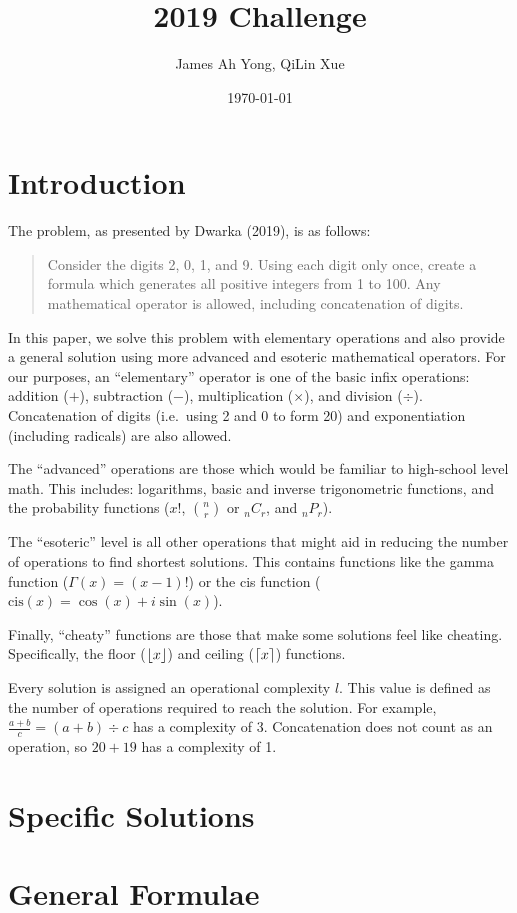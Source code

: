 \documentclass{article}
\title{2019 Challenge}
\author{James Ah Yong, QiLin Xue}
\date\today
\DeclarePairedDelimiter\ceil{\lceil}{\rceil}
\DeclarePairedDelimiter\floor{\lfloor}{\rfloor}
\begin{document}
\maketitle

\section{Introduction}

The problem, as presented by Dwarka (2019), is as follows:

\begin{quotation}
  Consider the digits 2, 0, 1, and 9.
  Using each digit only once, create a formula which generates all positive integers from 1 to 100.
  Any mathematical operator is allowed, including concatenation of digits.
\end{quotation}

In this paper, we solve this problem with elementary operations and also provide a general solution using more advanced and esoteric mathematical operators.
For our purposes, an ``elementary'' operator is one of the basic infix operations: addition ($+$), subtraction ($-$), multiplication ($\times$), and division ($\div$).
Concatenation of digits (i.e.\ using 2 and 0 to form 20) and exponentiation (including radicals) are also allowed.

The ``advanced'' operations are those which would be familiar to high-school level math.
This includes: logarithms, basic and inverse trigonometric functions, and the probability functions ($x!$, $\binom{n}{r}$ or $_nC_r$, and $_nP_r$).

The ``esoteric'' level is all other operations that might aid in reducing the number of operations to find shortest solutions.
This contains functions like the gamma function ($\Gamma(x) = (x-1)!$) or the cis function ($\mathrm{cis}(x) = \cos(x) + i \sin(x)$).

Finally, ``cheaty'' functions are those that make some solutions feel like cheating.
Specifically, the floor ($\floor{x}$) and ceiling ($\ceil{x}$) functions. 

Every solution is assigned an operational complexity $l$.
This value is defined as the number of operations required to reach the solution.
For example, $\frac{a+b}{c}=(a+b)\div c$ has a complexity of 3.
Concatenation does not count as an operation, so $20+19$ has a complexity of 1.

\section{Specific Solutions}



\section{General Formulae}


\end{document}
